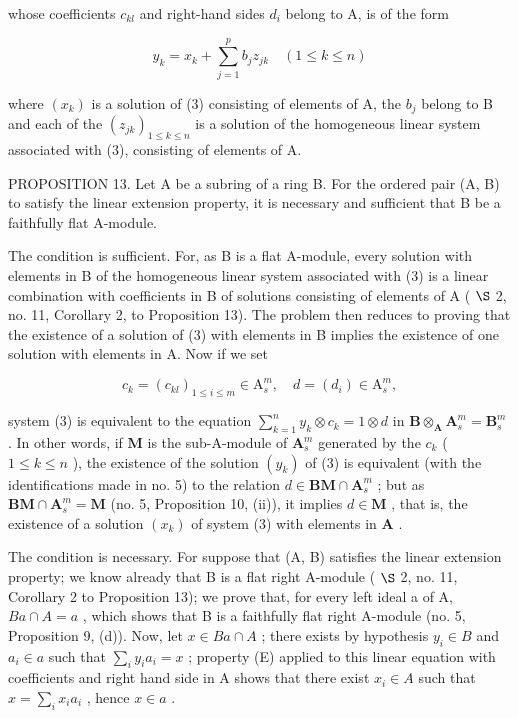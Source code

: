 whose coefficients \(c_{kl}\) and right-hand sides \(d_{i}\) belong to A, is of the form

\[
y _ {k} = x _ {k} + \sum_ {j = 1} ^ {p} b _ {j} z _ {j k} \quad (1 \leqslant k \leqslant n)\tag{4}
\]

where \((x_{k})\) is a solution of (3) consisting of elements of A, the \(b_{j}\) belong to B and each of the \((z_{jk})_{1\leq k\leq n}\) is a solution of the homogeneous linear system associated with (3), consisting of elements of A.

PROPOSITION 13. Let A be a subring of a ring B. For the ordered pair (A, B) to satisfy the linear extension property, it is necessary and sufficient that B be a faithfully flat A-module.

The condition is sufficient. For, as B is a flat A-module, every solution with elements in B of the homogeneous linear system associated with (3) is a linear combination with coefficients in B of solutions consisting of elements of A ( \(\S\) 2, no. 11, Corollary 2, to Proposition 13). The problem then reduces to proving that the existence of a solution of (3) with elements in B implies the existence of one solution with elements in A. Now if we set

\[
c _ {k} = \left(c _ {k l}\right) _ {1 \leqslant i \leqslant m} \in \mathrm{A} _ {s} ^ {m}, \quad d = (d _ {i}) \in \mathrm{A} _ {s} ^ {m},
\]

system (3) is equivalent to the equation \(\sum_{k=1}^{n} y_k \otimes c_k = 1 \otimes d\) in \(\mathbf{B} \otimes_{\mathbf{A}} \mathbf{A}_s^m = \mathbf{B}_s^m\) . In other words, if \(\mathbf{M}\) is the sub-A-module of \(\mathbf{A}_s^m\) generated by the \(c_k\) ( \(1 \leqslant k \leqslant n\) ), the existence of the solution \((y_k)\) of (3) is equivalent (with the identifications made in no. 5) to the relation \(d \in \mathbf{BM} \cap \mathbf{A}_s^m\) ; but as \(\mathbf{BM} \cap \mathbf{A}_s^m = \mathbf{M}\) (no. 5, Proposition 10, (ii)), it implies \(d \in \mathbf{M}\) , that is, the existence of a solution \((x_k)\) of system (3) with elements in \(\mathbf{A}\) .

The condition is necessary. For suppose that (A, B) satisfies the linear extension property; we know already that B is a flat right A-module ( \(\S\) 2, no. 11, Corollary 2 to Proposition 13); we prove that, for every left ideal a of A, \(Ba \cap A = a\) , which shows that B is a faithfully flat right A-module (no. 5, Proposition 9, (d)). Now, let \(x \in Ba \cap A\) ; there exists by hypothesis \(y_i \in B\) and \(a_i \in a\) such that \(\sum_{i} y_i a_i = x\) ; property (E) applied to this linear equation with coefficients and right hand side in A shows that there exist \(x_i \in A\) such that \(x = \sum_{i} x_i a_i\) , hence \(x \in a\) .

